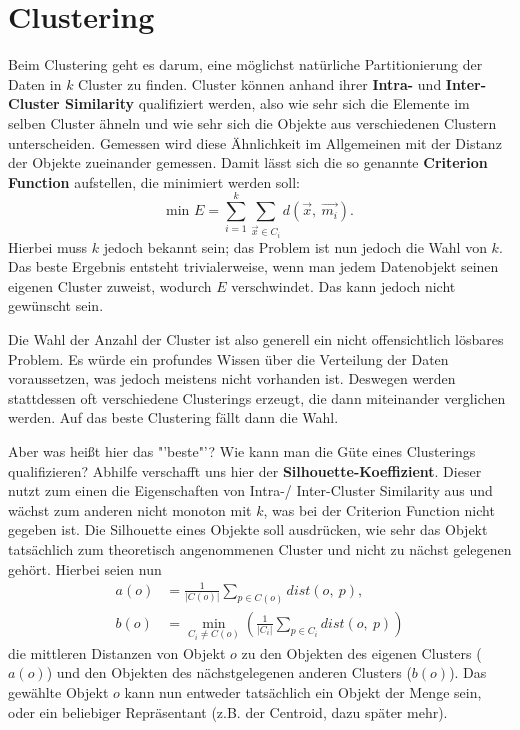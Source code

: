 \section{Clustering}
Beim Clustering geht es darum, eine möglichst natürliche 
Partitionierung der Daten in \(k\) Cluster zu finden. Cluster
können anhand ihrer \textbf{Intra-} und \textbf{Inter-Cluster
Similarity} qualifiziert werden, also wie sehr sich die Elemente
im selben Cluster ähneln und wie sehr sich die Objekte aus
verschiedenen Clustern unterscheiden. Gemessen wird diese
Ähnlichkeit im Allgemeinen mit der Distanz der Objekte zueinander
gemessen. Damit lässt sich die so genannte \textbf{Criterion
Function} aufstellen, die minimiert werden soll:
\[\text{min } E = \sum_{i=1}^k \sum_{\vec{x}\in C_i} 
d(\vec{x},\ \vec{m_i}).\]
Hierbei muss \(k\) jedoch bekannt sein; das Problem ist nun
jedoch die Wahl von \(k\). Das beste Ergebnis entsteht
trivialerweise, wenn man jedem Datenobjekt seinen eigenen
Cluster zuweist, wodurch \(E\) verschwindet. Das kann
jedoch nicht gewünscht sein. 

Die Wahl der Anzahl der Cluster ist also generell ein nicht 
offensichtlich lösbares Problem. Es würde ein profundes Wissen
über die Verteilung der Daten voraussetzen, was jedoch meistens
nicht vorhanden ist. Deswegen werden stattdessen oft verschiedene
Clusterings erzeugt, die dann miteinander verglichen werden. Auf
das beste Clustering fällt dann die Wahl.

Aber was heißt hier das "'beste"'? Wie kann man die Güte eines
Clusterings qualifizieren? Abhilfe verschafft uns hier der 
\textbf{Silhouette-Koeffizient}. Dieser nutzt zum einen die
Eigenschaften von Intra-/ Inter-Cluster Similarity aus und 
wächst zum anderen nicht monoton mit \(k\), was bei der
Criterion Function nicht gegeben ist. Die Silhouette eines Objekte
soll ausdrücken, wie sehr das Objekt tatsächlich zum
theoretisch angenommenen Cluster und nicht zu nächst gelegenen
gehört. Hierbei seien nun
\begin{align*}
a(o)&=\frac{1}{\left| C(o) \right|}\sum_{p \in C(o)}dist(o,\ p),\\
b(o)&=\min_{C_i \neq C(o)} \left(\frac{1}{\left| C_i \right|}
\sum_{p \in C_i}dist(o,\ p)\right)
\end{align*}
die mittleren Distanzen von Objekt \(o\) zu den Objekten des
eigenen Clusters (\(a(o)\)) und den Objekten des nächstgelegenen
anderen Clusters (\(b(o)\)). Das gewählte Objekt \(o\) kann
nun entweder tatsächlich ein Objekt der Menge sein, oder ein
beliebiger Repräsentant (z.B. der Centroid, dazu später mehr).

